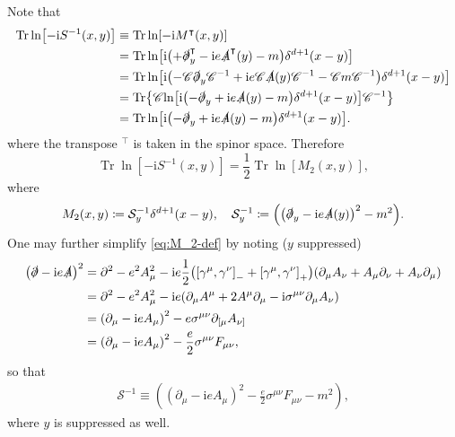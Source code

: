 \documentclass[12pt]{article}
\newcommand\mi{\mathrm{i}} %
\DeclareMathOperator{\Tr}{Tr}
\newcommand{\rbr}[1]{{\left(#1\right)}}
\newcommand{\sbr}[1]{{\left[#1\right]}}
\newcommand{\rfun}[2]{{#1}\mathopen{}\left(#2\right)\mathclose{}}
\newcommand{\sfun}[2]{{#1}\mathopen{}\left[#2\right]\mathclose{}}
\newcommand{\cfun}[2]{{#1}\mathopen{}\left\{#2\right\}\mathclose{}}
\begin{document}
Note that
\begin{align}
\Tr \sfun{\ln}{-\mi \rfun{S^{-1}}{x, y}} &\equiv
\Tr \sfun{\ln}{-\mi \rfun{M^\intercal}{x, y}} \nonumber \\
&= \Tr \sfun{\ln}{\mi\rbr{ +\slashed{\partial}_y^\intercal -\mi e 
\rfun{\slashed{A}^\intercal}{y} - m}\rfun{\delta^{d+1}}{x-y}} \nonumber \\
&= \Tr \sfun{\ln}{\mi\rbr{ -\mathscr{C}\slashed{\partial}_y\mathscr{C}^{-1}
+\mi e \mathscr{C}\rfun{\slashed{A}}{y}\mathscr{C}^{-1}
-\mathscr{C}m\mathscr{C}^{-1}} \rfun{\delta^{d+1}}{x-y}} \nonumber \\
&= \cfun{\Tr}{\mathscr{C}\sfun{\ln}{\mi\rbr{-\slashed{\partial}_y
+\mi e \rfun{\slashed{A}}{y} -m} \rfun{\delta^{d+1}}{x-y}}\mathscr{C}^{-1}} 
\nonumber \\
&= \Tr \sfun{\ln}{\mi\rbr{-\slashed{\partial}_y
+\mi e \rfun{\slashed{A}}{y} -m} \rfun{\delta^{d+1}}{x-y}}.
\end{align}
where the transpose ${}^\intercal$ is taken in the spinor space. Therefore
\begin{equation}
\Tr \sfun{\ln}{-\mi \rfun{S^{-1}}{x, y}} =
\frac{1}{2} \Tr \sfun{\ln}{\rfun{M_2}{x, y}},
\label{eq:Tr-M_2}
\end{equation}
where
\begin{align}
\rfun{M_2}{x, y} \coloneqq \mathcal{S}^{-1}_y \rfun{\delta^{d+1}}{x-y},\quad
\mathcal{S}^{-1}_y \coloneqq \rbr{\rbr{\slashed{\partial}_y-\mi e 
\rfun{\slashed{A}}{y}}^2 - m^2}.
\label{eq:M_2-def}
\end{align}
One may further simplify \cref{eq:M_2-def} by noting ($y$ suppressed)
\begin{align}
\rbr{\slashed{\partial} -\mi e \slashed{A}}^2 &=
\partial^2 - e^2 A_\mu^2 -\mi e \frac{1}{2}\rbr{\sbr{\gamma^\mu, \gamma^\nu}_- 
+ \sbr{\gamma^\mu, \gamma^\nu}_+}
\rbr{\partial_\mu A_\nu + A_\mu \partial_\nu + A_\nu \partial_\mu} 
\nonumber \\
&= \partial^2 - e^2 A_\mu^2 - \mi e \rbr{\partial_\mu A^\mu + 2A^\mu 
\partial_\mu - \mi \sigma^{\mu\nu} \partial_\mu A_\nu} \nonumber \\
&= \rbr{\partial_\mu - \mi e A_\mu}^2
- e \sigma^{\mu\nu} \partial_{[\mu} A_{\nu]} \nonumber \\
&= \rbr{\partial_\mu - \mi e A_\mu}^2 - \frac{e}{2} \sigma^{\mu\nu} F_{\mu\nu},
\end{align}
so that
\begin{align}
\mathcal{S}^{-1} \equiv \rbr{\rbr{\partial_{\mu} - \mi e A_\mu}^2 - 
\frac{e}{2} \sigma^{\mu\nu} F_{\mu\nu} - m^2},
\label{eq:M_2-simp}
\end{align}
where $y$ is suppressed as well.
\end{document}
